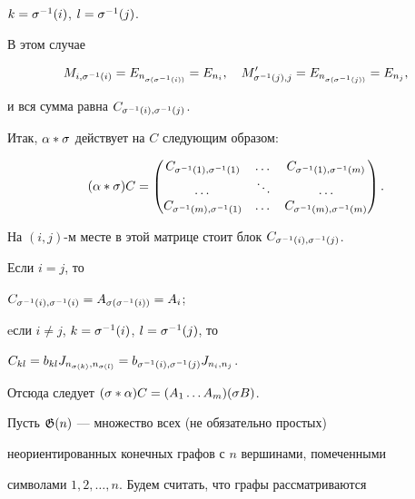 \begin{pf}
$k=\sigma ^{-1}(i)$, $l=\sigma ^{-1}(j)$.


В этом случае


$$


M_{i,\s ^{-1}(i)}=E_{n_{\s (\s ^{-1}(i))}}=E_{n_i},\quad


M'_{\s ^{-1}(j),j}=E_{n_{\s (\s ^{-1}(j))}}=E_{n_j},


$$


и вся сумма равна $C_{\sigma ^{-1}(i),\sigma ^{-1}(j)}$.





Итак, $\alpha * \sigma $ действует на $C$ следующим образом:


$$


(\al * \s )C=


\begin{pmatrix}


C_{\s ^{-1}(1),\s ^{-1}(1)} & \dotsc & C_{\s ^{-1}(1),\s ^{-1}(m)} \\


\dotsc & \ddots & \dotsc \\


C_{\s ^{-1}(m),\s ^{-1}(1)} & \dotsc & C_{\s ^{-1}(m),\s ^{-1}(m)}


\end{pmatrix}.


$$


На $(i,j)$-м месте в этой матрице стоит блок $C_{\sigma ^{-1}(i),\sigma ^{-1}(j)}$.


Если $i=j$, то


$C_{\sigma ^{-1}(i),\sigma ^{-1}(i)}=A_{\sigma (\sigma ^{-1}(i))}=A_i$;


eсли $i\ne j$, $k=\sigma ^{-1}(i)$, $l=\sigma ^{-1}(j)$, то


$C_{kl}=b_{kl}J_{n_{\sigma (k)},n_{\sigma (l)}}=b_{\sigma ^{-1}(i),\sigma ^{-1}(j)}J_{n_i,n_j}$.





Отсюда следует $(\sigma * \alpha)C=(A_1\dotsc A_m)(\sigma B)$.


\end{pf}








Пусть ${\frak G} (n)$ --- множество всех (не обязательно простых) 


неориентированных конечных графов с $n$ вершинами, помеченными 


символами $1, 2,\dotsc ,n$. Будем считать, что графы рассматриваются


